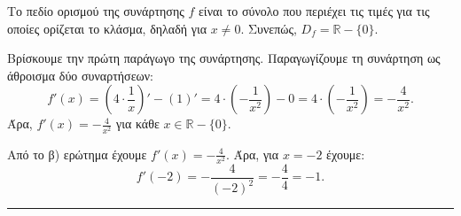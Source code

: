 \begin{alist}
\item  Το πεδίο ορισμού της συνάρτησης $f$ είναι το σύνολο που περιέχει τις τιμές για τις οποίες ορίζεται το κλάσμα, δηλαδή για $x \neq 0$. Συνεπώς, $D_f = \mathbb{R} - \{0\}$.
\item Βρίσκουμε την πρώτη παράγωγο της συνάρτησης.
Παραγωγίζουμε τη συνάρτηση ως άθροισμα δύο συναρτήσεων:
\[ f'(x) = \left(4 \cdot \frac{1}{x}\right)' - (1)' = 4 \cdot \left(-\frac{1}{x^2}\right) - 0 = 4 \cdot \left(-\frac{1}{x^2}\right) = -\frac{4}{x^2}. \]
Άρα, $f'(x) = -\frac{4}{x^2}$ για κάθε $x \in \mathbb{R} - \{0\}$.
\item Από το β) ερώτημα έχουμε $f'(x) = -\frac{4}{x^2}$.
Άρα, για $x=-2$ έχουμε:
\[ f'(-2) = -\frac{4}{(-2)^2} = -\frac{4}{4} = -1. \]
\end{alist}
\vspace{6mm}
\noindent\rule{\textwidth}{0.4pt}
\vspace{6mm}

